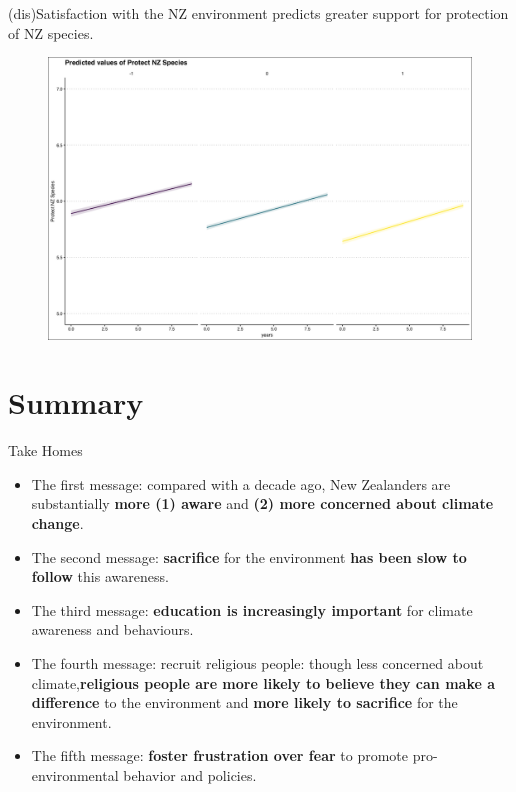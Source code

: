 \documentclass{beamer}
\begin{document}
\begin{frame}{(dis)Satisfaction with the NZ environment predicts greater support for protection of NZ species.}
\begin{figure}
\includegraphics[width=.8\textwidth,height=\textheight,keepaspectratio]{Figures/XY_PLOT_Env.NATIVE.SPECIES.SATENVIRON.png}
\end{figure}
\end{frame}


\section{Summary}

\begin{frame}{Take Homes}

  \begin{itemize}
  \item
         The \alert{first message}: compared with a decade ago, New Zealanders are substantially {\bf more (1) aware} and {\bf (2) more concerned about climate change}.
        \pause
  \item
    The  \alert{second message}: {\bf sacrifice} for the environment {\bf has been slow to follow} this awareness.
    \pause
    
    \item
    The  \alert{third message}: {\bf education is increasingly important} for climate awareness and behaviours.
    \pause
    
     \item
    The  \alert{fourth message}: recruit religious people: though less concerned about climate,{\bf religious people are more likely to believe they can make a difference} to the environment and {\bf more likely to sacrifice} for the environment.
     \pause
     
    \item
    The  \alert{fifth message}: {\bf foster frustration over fear} to promote pro-environmental behavior and policies.
    
    \pause
    
  \end{itemize}

\end{frame}
\end{document}
